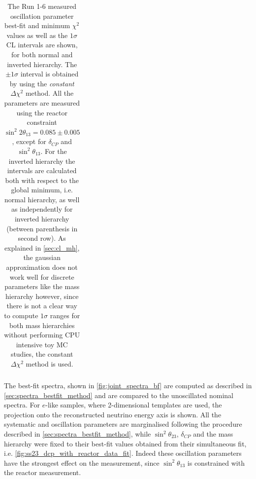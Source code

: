 \begin{table}[htb]
\begin{tabular}{| c | c || c | c | c || c | c | c |}
\hline
\end{tabular}
\caption{
The Run 1-6 measured oscillation parameter best-fit
and minimum $\chi^2$ 
values  
as well as the 
$1\sigma$
CL intervals are shown,
for both normal and inverted hierarchy. 
The $\pm1\sigma$ interval is obtained by using the 
\emph{constant} $\Delta \chi^2$ method.
All the parameters are measured using the reactor constraint 
$\sin^2 2\theta_{13} = 0.085 \pm 0.005 $
\cite{pdg_2014},
except for $\delta_{CP}$ and $\sin^2 \theta_{13}$.
For the inverted hierarchy the intervals are calculated both with respect to 
the global minimum, i.e. normal hierarchy, as well as 
independently for inverted hierarchy (between parenthesis in second row).
As explained in \cref{sec:cl_mh}, the gaussian approximation does not work well 
for discrete parameters like the mass hierarchy however, since there is not a clear way
to compute $1\sigma$ ranges for both mass hierarchies without performing
CPU intensive toy MC studies, the constant $\Delta \chi^2$ method is used.
}                                                                                                                                                                                          
\label{tab:joint_bestfit}
\end{table}





The best-fit spectra, shown in \cref{fig:joint_spectra_bf} are computed as described in \cref{sec:spectra_bestfit_method}
and are compared to the unoscillated nominal spectra.
For $e$-like samples, where 2-dimensional templates are used,
the projection onto the reconstructed neutrino energy axis is shown.
All the systematic and oscillation parameters are marginalised following the procedure described in \cref{sec:spectra_bestfit_method},
while $\sin^2\theta_{23}$, $\delta_{CP}$ and the mass hierarchy were fixed to their best-fit values 
obtained from their simultaneous fit, i.e. \cref{fig:ss23_dcp_with_reactor_data_fit}.
Indeed these oscillation parameters have the strongest effect on the measurement,
since $\sin^2\theta_{13}$ is constrained with the reactor measurement.


